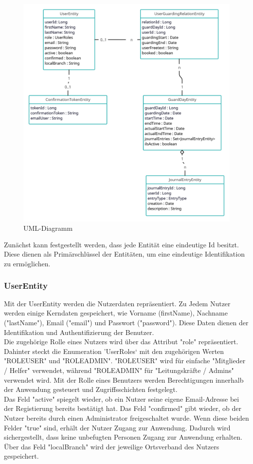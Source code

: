 \documentclass[fontsize=12pt,openright,oneside,paper=a4,BCOR=1cm]{scrbook}
\begin{document}
\begin{figure}[H]
  \centering
  \includegraphics[width=0.6\linewidth]{Anlagen/umlDiagramm.png} 
  \caption{UML-Diagramm}
  \label{fig:anmeldeprozess}
\end{figure}

Zunächst kann festgestellt werden, dass jede Entität eine eindeutige Id besitzt. Diese dienen als Primärschlüssel der Entitäten, um eine eindeutige Identifikation zu ermöglichen.

\subsubsection{UserEntity}
Mit der UserEntity werden die Nutzerdaten repräsentiert. Zu Jedem Nutzer werden einige Kerndaten gespeichert, wie Vorname (\glq firstName\grq{}), Nachname ("lastName"), Email ("email") und Passwort ("password"). Diese Daten dienen der Identifikation und Authentifizierung der Benutzer. \\
Die zugehörige Rolle eines Nutzers wird über das Attribut "role" repräsentiert. Dahinter steckt die Enumeration 'UserRoles‘ mit den zugehörigen Werten "ROLE\textunderscore USER" und "ROLE\textunderscore ADMIN". "ROLE\textunderscore USER" wird für einfache "Mitglieder / Helfer" verwendet, während "ROLE\textunderscore ADMIN" für "Leitungskräfte / Admins" verwendet wird. Mit der Rolle eines Benutzers werden Berechtigungen innerhalb der Anwendung gesteuert und Zugriffsschichten festgelegt. \\ 
Das Feld "active" spiegelt wieder, ob ein Nutzer seine eigene Email-Adresse bei der Registierung bereits bestätigt hat. Das Feld "confirmed" gibt wieder, ob der Nutzer bereits durch einen Administrator freigeschaltet wurde. Wenn diese beiden Felder "true" sind, erhält der Nutzer Zugang zur Anwendung. Dadurch wird sichergestellt, dass keine unbefugten Personen Zugang zur Anwendung erhalten. \\
Über das Feld "localBranch" wird der jeweilige Ortsverband des Nutzers gespeichert.
\end{document}
